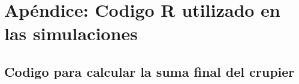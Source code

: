 \documentclass[12pt,a4paper,]{book}
\def\ifdoblecara{} %
\numberwithin{dummy}{section}
\theoremstyle{ocrenumbox}
\theoremstyle{blacknumex}
\theoremstyle{blacknumbox}
\theoremstyle{ocrenum}
\theoremstyle{ocrenum}
\begin{document}
\ifdefined\ifdoblecara
\fancyhead{}{}
\fancyhead[LE,RO]{\scriptsize\rightmark}
\fancyfoot[LO,RE]{\scriptsize\slshape \leftmark}
\fancyfoot[C]{}
\fancyfoot[LE,RO]{\footnotesize\thepage}
\else
\fancyhead{}{}
\fancyhead[RO]{\scriptsize\rightmark}
\fancyfoot[LO]{\scriptsize\slshape \leftmark}
\fancyfoot[C]{}
\fancyfoot[RO]{\footnotesize\thepage}
\fi

\renewcommand{\headrulewidth}{0.4pt}
\renewcommand{\footrulewidth}{0.4pt}

\hypertarget{apuxe9ndice-codigo-r-utilizado-en-las-simulaciones}{%
\chapter{Apéndice: Codigo R utilizado en las
simulaciones}\label{apuxe9ndice-codigo-r-utilizado-en-las-simulaciones}}

\hypertarget{codigo-para-calcular-la-suma-final-del-crupier}{%
\section{Codigo para calcular la suma final del
crupier}\label{codigo-para-calcular-la-suma-final-del-crupier}}
\end{document}
